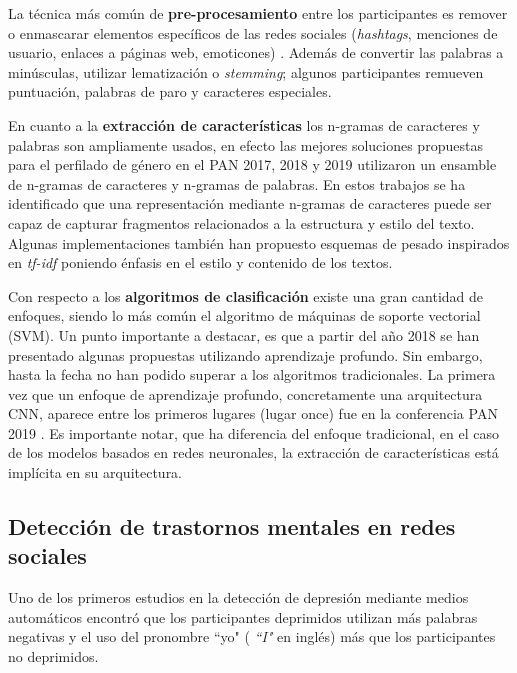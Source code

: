 La técnica más común de \textbf{pre-procesamiento} entre los participantes es remover o enmascarar elementos específicos de las redes sociales (\textit{hashtags}, menciones de usuario, enlaces a páginas web, emoticones) \citep{daneshvar2018gender, jimenez2019bots, Pizarro2019}. Además de convertir las palabras a minúsculas, utilizar lematización  o \textit{stemming}; algunos participantes remueven puntuación, palabras de paro y caracteres especiales.

En cuanto a la \textbf{extracción de características} los n-gramas de caracteres y palabras son ampliamente usados, en efecto las mejores soluciones propuestas para el perfilado de género en el PAN 2017, 2018 y 2019 \citep{basile2017there, daneshvar2018gender, Pizarro2019} utilizaron un ensamble de n-gramas de caracteres y n-gramas de palabras. En estos trabajos se ha identificado que una representación mediante n-gramas de caracteres puede ser capaz de capturar fragmentos relacionados a la estructura y estilo del texto. Algunas implementaciones también han propuesto esquemas de pesado inspirados en \textit{tf-idf} poniendo énfasis en el estilo y contenido de los textos.

Con respecto a los \textbf{algoritmos de clasificación} existe una gran cantidad de enfoques, siendo lo más común el algoritmo de máquinas de soporte vectorial (SVM). Un punto importante a destacar, es que a partir del año 2018 se han presentado algunas propuestas utilizando aprendizaje profundo. Sin embargo, hasta la fecha no han podido superar a los algoritmos tradicionales. 
La primera vez que un enfoque de aprendizaje profundo, concretamente una arquitectura CNN, aparece entre los primeros lugares (lugar once) fue en la conferencia PAN 2019 \citep{Rangel2019}. Es importante notar, que ha diferencia del enfoque tradicional, en el caso de los modelos basados en redes neuronales, la extracción de características está implícita en su arquitectura.

\subsection{Detección de trastornos mentales en redes sociales}
Uno de los primeros estudios en la detección de depresión mediante medios automáticos \citep{rude2004language} encontró que los participantes deprimidos utilizan más palabras negativas y el uso del pronombre ``yo" ( \textit{``I"} en inglés) más que los participantes no deprimidos. 

